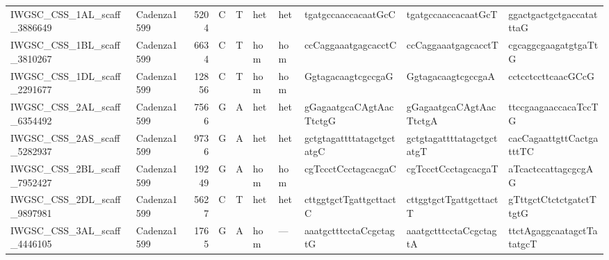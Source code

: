 \begin{tabular}{llrlllllll}
 IWGSC\_CSS\_1AL\_scaff\_3886649  & Cadenza1599 &       5204 & C         & T        & het            & het         & tgatgccaaccacaatGcC       & tgatgccaaccacaatGcT       & ggactgactgctgaccatatttaG  \\
 IWGSC\_CSS\_1BL\_scaff\_3810267  & Cadenza1599 &       6634 & C         & T        & hom            & hom         & ccCaggaaatgagcacctC       & ccCaggaaatgagcacctT       & cgcaggcgaagatgtgaTtG      \\
 IWGSC\_CSS\_1DL\_scaff\_2291677  & Cadenza1599 &      12856 & C         & T        & hom            & hom         & GgtagacaagtcgccgaG        & GgtagacaagtcgccgaA        & cctcctccttcaacGCcG        \\
 IWGSC\_CSS\_2AL\_scaff\_6354492  & Cadenza1599 &       7566 & G         & A        & het            & het         & gGagaatgcaCAgtAacTtctgG   & gGagaatgcaCAgtAacTtctgA   & ttccgaagaaccacaTccTG      \\
 IWGSC\_CSS\_2AS\_scaff\_5282937  & Cadenza1599 &       9736 & G         & A        & het            & het         & gctgtagattttatagctgctatgC & gctgtagattttatagctgctatgT & cacCagaattgttCactgatttTC  \\
 IWGSC\_CSS\_2BL\_scaff\_7952427  & Cadenza1599 &      19249 & G         & A        & hom            & hom         & cgTccctCcctagcacgaC       & cgTccctCcctagcacgaT       & aTcactccattagcgcgAG       \\
 IWGSC\_CSS\_2DL\_scaff\_9897981  & Cadenza1599 &       5627 & C         & T        & het            & het         & cttggtgctTgattgcttactC    & cttggtgctTgattgcttactT    & gTttgctCtctctgatctTtgtG   \\
 IWGSC\_CSS\_3AL\_scaff\_4446105  & Cadenza1599 &       1765 & G         & A        & hom            & ---         & aaatgctttcctaCcgctagtG    & aaatgctttcctaCcgctagtA    & ttctAgaggcaatagctTatatgcT \\
\bottomrule
\end{tabular}
